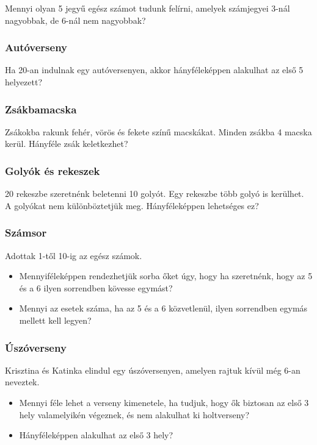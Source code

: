 \documentclass[a4paper]{article}
\begin{document}
Mennyi olyan 5 jegyű egész számot tudunk felírni, amelyek számjegyei 3-nál nagyobbak, de 6-nál nem nagyobbak?

\subsubsection{Autóverseny}

Ha 20-an indulnak egy autóversenyen, akkor hányféleképpen alakulhat az első 5 helyezett?

\subsubsection{Zsákbamacska}

Zsákokba rakunk fehér, vörös és fekete színű macskákat. Minden zsákba 4 macska kerül.
Hányféle zsák keletkezhet?

\subsubsection{Golyók és rekeszek}

20 rekeszbe szeretnénk beletenni 10 golyót.
Egy rekeszbe több golyó is kerülhet.
A golyókat nem különböztetjük meg.
Hányféleképpen lehetséges ez?

\subsubsection{Számsor}

Adottak 1-től 10-ig az egész számok.
\begin{itemize}
\item Mennyiféleképpen rendezhetjük sorba őket úgy, hogy ha szeretnénk, hogy az 5 és a 6 ilyen sorrendben kövesse egymást?
\item Mennyi az esetek száma, ha az 5 és a 6 közvetlenül, ilyen sorrendben egymás mellett kell legyen?
\end{itemize}

\subsubsection{Úszóverseny}

Krisztina és Katinka elindul egy úszóversenyen, amelyen rajtuk kívül még 6-an neveztek.
\begin{itemize}
\item Mennyi féle lehet a verseny kimenetele, ha tudjuk, hogy ők biztosan az első 3 hely valamelyikén végeznek, és nem alakulhat ki holtverseny?
\item Hányféleképpen alakulhat az első 3 hely?
\end{itemize}
\end{document}
